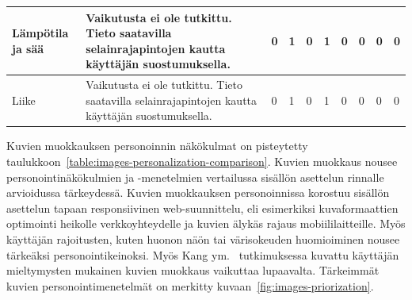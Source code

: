 \documentclass[finnish, 12pt, a4paper, elec, utf8, a-1b, online]{aaltothesis}
\begin{document}
{\begin{longtable}{p{2.5cm}|p{6cm}|p{0.5cm}p{0.5cm}p{0.5cm}|p{0.5cm}|p{0.5cm}p{0.5cm}p{0.5cm}|p{0.5cm}|}
    \midrule
    Lämpötila ja sää                       & Vaikutusta ei ole tutkittu. Tieto saatavilla selainrajapintojen kautta käyttäjän suostumuksella.                                                                                                                                                                                                                                                                      & 0                                          & 1                                   & 0                                      & 1                            & 0                                               & 0                                         & 0                                         & 0                            \\
    \midrule
    Liike                                  & Vaikutusta ei ole tutkittu. Tieto saatavilla selainrajapintojen kautta käyttäjän suostumuksella.                                                                                                                                                                                                                                                                      & 0                                          & 1                                   & 0                                      & 1                            & 0                                               & 0                                         & 0                                         & 0                            \\
\end{longtable}
}

Kuvien muokkauksen personoinnin näkökulmat on pisteytetty
taulukkoon~\ref{table:images-personalization-comparison}. Kuvien muokkaus nousee
personointinäkökulmien ja -menetelmien vertailussa sisällön asettelun rinnalle
arvioidussa tärkeydessä. Kuvien muokkauksen personoinnissa korostuu sisällön
asettelun tapaan responsiivinen web-suunnittelu, eli esimerkiksi kuvaformaattien
optimointi heikolle verkkoyhteydelle ja kuvien älykäs rajaus mobiililaitteille.
Myös käyttäjän rajoitusten, kuten huonon näön tai värisokeuden huomioiminen
nousee tärkeäksi personointikeinoksi. Myös Kang ym.~\cite{5539850} tutkimuksessa
kuvattu käyttäjän mieltymysten mukainen kuvien muokkaus vaikuttaa lupaavalta.
Tärkeimmät kuvien personointimenetelmät on merkitty
kuvaan~\ref{fig:images-priorization}.
\end{document}
